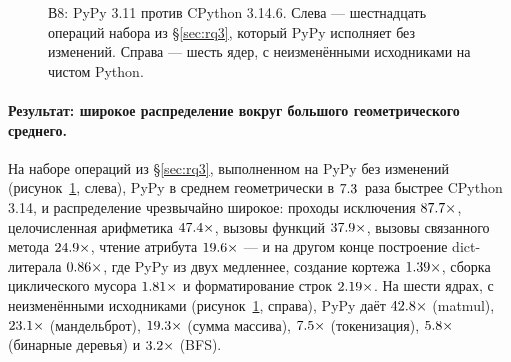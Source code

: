\begin{figure}[t]
  \centering
  \caption{В8: PyPy 3.11 против CPython 3.14.6. Слева --- шестнадцать операций набора из
    \S\ref{sec:rq3}, который PyPy исполняет без изменений. Справа --- шесть ядер, с
    неизменёнными исходниками на чистом Python.}
  \label{fig:pypy}
\end{figure}

\paragraph{Результат: широкое распределение вокруг большого геометрического среднего.}
На наборе операций из \S\ref{sec:rq3}, выполненном на PyPy без изменений
(рисунок~\ref{fig:pypy}, слева),
PyPy в среднем геометрически в $\meas{geomean:b3_runtime-v314|b3_runtime-pypy311}{7.3}$~раза быстрее CPython 3.14, и распределение чрезвычайно
широкое: проходы исключения $\meas{ratio:b3_runtime-v314:exception_roundtrip/v314|b3_runtime-pypy311:exception_roundtrip/pypy311}{87.7}\times$, целочисленная арифметика $\meas{ratio:b3_runtime-v314:int_arith/v314|b3_runtime-pypy311:int_arith/pypy311}{47.4}\times$, вызовы функций
$\meas{ratio:b3_runtime-v314:func_call/v314|b3_runtime-pypy311:func_call/pypy311}{37.9}\times$, вызовы связанного метода $\meas{ratio:b3_runtime-v314:method_call/v314|b3_runtime-pypy311:method_call/pypy311}{24.9}\times$, чтение атрибута $\meas{ratio:b3_runtime-v314:attr_get/v314|b3_runtime-pypy311:attr_get/pypy311}{19.6}\times$ --- и на другом
конце построение dict-литерала $\meas{ratio:b3_runtime-v314:create_dict/v314|b3_runtime-pypy311:create_dict/pypy311}{0.86}\times$, где PyPy из двух медленнее, создание кортежа
$\meas{ratio:b3_runtime-v314:create_tuple/v314|b3_runtime-pypy311:create_tuple/pypy311}{1.39}\times$, сборка циклического мусора $\meas{ratio:b3_runtime-v314:gc_collect_100k_cycles/v314|b3_runtime-pypy311:gc_collect_100k_cycles/pypy311}{1.81}\times$ и форматирование строк $\meas{ratio:b3_runtime-v314:str_format_join/v314|b3_runtime-pypy311:str_format_join/pypy311}{2.19}\times$. На шести
ядрах, с неизменёнными исходниками (рисунок~\ref{fig:pypy}, справа), PyPy даёт $\meas{ratio:b1_compute-314:matmul/cpython_loop|b1_compute-pypy311:matmul/cpython_loop}{42.8}\times$ (matmul),
$\meas{ratio:b1_compute-314:mandelbrot/cpython_loop|b1_compute-pypy311:mandelbrot/cpython_loop}{23.1}\times$ (мандельброт), $\meas{ratio:b1_compute-314:arraysum/cpython_loop|b1_compute-pypy311:arraysum/cpython_loop}{19.3}\times$ (сумма массива), $\meas{ratio:b2_branchy-314:tokenize/cpython_loop|b2_branchy-pypy311:tokenize/cpython_loop}{7.5}\times$ (токенизация), $\meas{ratio:b2_branchy-314:binarytrees/cpython_loop|b2_branchy-pypy311:binarytrees/cpython_loop}{5.8}\times$
(бинарные деревья) и $\meas{ratio:b2_branchy-314:bfs/cpython_loop|b2_branchy-pypy311:bfs/cpython_loop}{3.2}\times$ (BFS).


